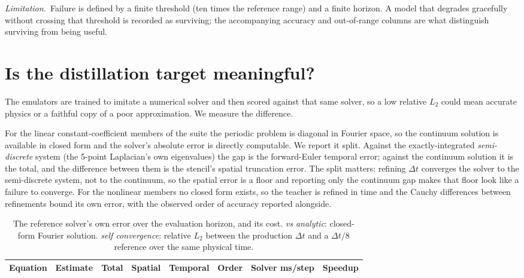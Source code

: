 \documentclass{article}
\newcommand{\limitation}[1]{\par\smallskip\noindent\textit{Limitation.}~#1\par\smallskip}
\begin{document}
\limitation{Failure is defined by a finite threshold (ten times the reference range) and a
finite horizon. A model that degrades gracefully without crossing that threshold is
recorded as surviving; the accompanying accuracy and out-of-range columns are what
distinguish surviving from being useful.}

\section{Is the distillation target meaningful?}
\label{sec:teacher}

The emulators are trained to imitate a numerical solver and then scored against that same
solver, so a low relative $L_2$ could mean accurate physics or a faithful copy of a poor
approximation. We measure the difference.

For the linear constant-coefficient members of the suite the periodic problem is diagonal
in Fourier space, so the continuum solution is available in closed form and the solver's
absolute error is directly computable. We report it split. Against the exactly-integrated
\emph{semi-discrete} system (the 5-point Laplacian's own eigenvalues) the gap is the
forward-Euler temporal error; against the continuum solution it is the total, and the
difference between them is the stencil's spatial truncation error. The split matters:
refining $\Delta t$ converges the solver to the semi-discrete system, not to the
continuum, so the spatial error is a floor and reporting only the continuum gap makes that
floor look like a failure to converge. For the nonlinear members no closed form exists, so
the teacher is refined in time and the Cauchy differences between refinements bound its
own error, with the observed order of accuracy reported alongside.

\begin{table}[h]
\centering
\caption{The reference solver's own error over the evaluation horizon, and its cost.
\emph{vs analytic}: closed-form Fourier solution. \emph{self convergence}: relative $L_2$
between the production $\Delta t$ and a $\Delta t/8$ reference over the same physical
time.}
\label{tab:teacher}
\small
\begin{tabular}{llccccrc}
\toprule
Equation & Estimate & Total & Spatial & Temporal & Order & Solver ms/step & Speedup \\
\midrule

\bottomrule
\end{tabular}
\end{table}
\end{document}
